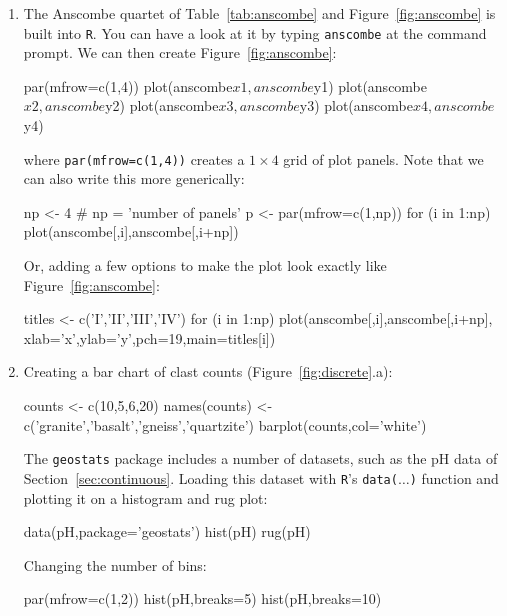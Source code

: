 \begin{enumerate}

\item\label{it:anscombe} The Anscombe quartet of
  Table~\ref{tab:anscombe} and Figure~\ref{fig:anscombe} is built into
  \texttt{R}. You can have a look at it by typing \texttt{anscombe} at
  the command prompt. We can then create Figure~\ref{fig:anscombe}:

\begin{script}
par(mfrow=c(1,4))
plot(anscombe$x1,anscombe$y1)
plot(anscombe$x2,anscombe$y2)
plot(anscombe$x3,anscombe$y3)
plot(anscombe$x4,anscombe$y4)
\end{script}

\noindent where \texttt{par(mfrow=c(1,4))} creates a $1\times{4}$ grid
of plot panels. Note that we can also write this more generically:

\begin{script}
np <- 4 # np = 'number of panels'
p <- par(mfrow=c(1,np))
for (i in 1:np){
  plot(anscombe[,i],anscombe[,i+np])
}
\end{script}

Or, adding a few options to make the plot look exactly like
Figure~\ref{fig:anscombe}:

\begin{script}[firstnumber=3]
titles <- c('I','II','III','IV')
for (i in 1:np){
  plot(anscombe[,i],anscombe[,i+np],
       xlab='x',ylab='y',pch=19,main=titles[i])
}
\end{script}

\item Creating a bar chart of clast counts
  (Figure~\ref{fig:discrete}.a):

\begin{script}
counts <- c(10,5,6,20)
names(counts) <- c('granite','basalt','gneiss','quartzite')
barplot(counts,col='white')
\end{script}

The \texttt{geostats} package includes a number of datasets, such as
the pH data of Section~\ref{sec:continuous}. Loading this dataset with
\texttt{R}'s \texttt{data($\ldots$)} function and plotting it on a
histogram and rug plot:

\begin{script}
data(pH,package='geostats')
hist(pH)
rug(pH)
\end{script}

Changing the number of bins:

\begin{script}[firstnumber=2]
par(mfrow=c(1,2))
hist(pH,breaks=5)
hist(pH,breaks=10)
\end{script}


\end{enumerate}
